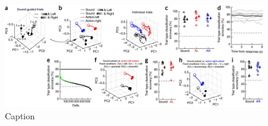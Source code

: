 \begin{figure}[htbp]

\begin{center}
\includegraphics[width=\textwidth]{Figures/NN_fig5.jpg} 
\end{center}

\caption[Rule implementations are associated with distinct population activity patterns]
{Caption}

\label{fig:NN_fig5}
\end{figure}